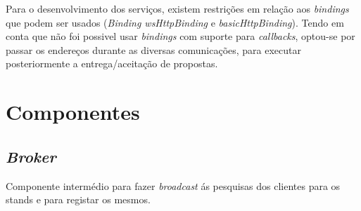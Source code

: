 \documentclass[a4paper]{article}
\begin{document}
Para o desenvolvimento dos serviços, existem restrições em relação aos \emph{bindings} que podem ser usados (\emph{Binding wsHttpBinding} e \emph{basicHttpBinding}). Tendo em conta que não foi possivel usar \emph{bindings} com suporte para \emph{callbacks}, optou-se por passar os endereços durante as diversas comunicações, para executar posteriormente a entrega/aceitação de propostas.

\newpage

\section{Componentes}

\subsection{\emph{Broker} } Componente intermédio para fazer \emph{broadcast} ás pesquisas dos clientes para os stands e para registar os mesmos.
\end{document}
